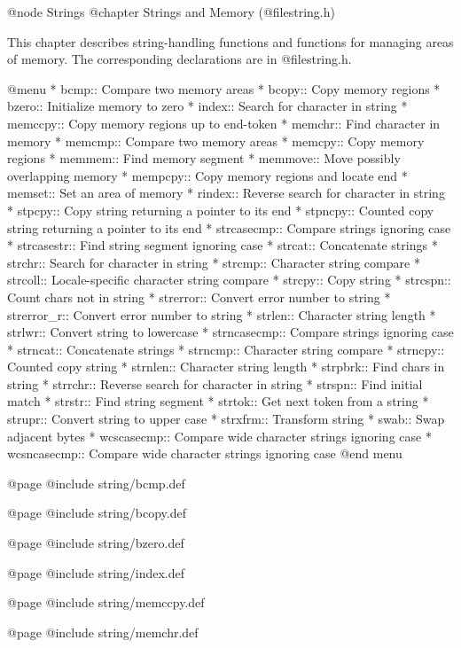 @node Strings
@chapter Strings and Memory (@file{string.h})

This chapter describes string-handling functions and functions for
managing areas of memory.  The corresponding declarations are in
@file{string.h}.

@menu
* bcmp::        Compare two memory areas
* bcopy::       Copy memory regions
* bzero::       Initialize memory to zero
* index::       Search for character in string
* memccpy::     Copy memory regions up to end-token
* memchr::      Find character in memory
* memcmp::      Compare two memory areas
* memcpy::      Copy memory regions
* memmem::      Find memory segment
* memmove::     Move possibly overlapping memory
* mempcpy::	Copy memory regions and locate end
* memset::      Set an area of memory
* rindex::      Reverse search for character in string
* stpcpy::      Copy string returning a pointer to its end
* stpncpy::     Counted copy string returning a pointer to its end
* strcasecmp::	Compare strings ignoring case
* strcasestr::	Find string segment ignoring case
* strcat::      Concatenate strings
* strchr::      Search for character in string
* strcmp::      Character string compare
* strcoll::     Locale-specific character string compare
* strcpy::      Copy string
* strcspn::     Count chars not in string
* strerror::    Convert error number to string
* strerror_r::  Convert error number to string
* strlen::      Character string length
* strlwr::	Convert string to lowercase
* strncasecmp::	Compare strings ignoring case
* strncat::     Concatenate strings
* strncmp::     Character string compare
* strncpy::     Counted copy string
* strnlen::     Character string length
* strpbrk::     Find chars in string
* strrchr::     Reverse search for character in string
* strspn::      Find initial match
* strstr::      Find string segment
* strtok::      Get next token from a string
* strupr::	Convert string to upper case
* strxfrm::     Transform string
* swab::        Swap adjacent bytes
* wcscasecmp::  Compare wide character strings ignoring case
* wcsncasecmp:: Compare wide character strings ignoring case
@end menu

@page
@include string/bcmp.def

@page
@include string/bcopy.def

@page
@include string/bzero.def

@page
@include string/index.def

@page
@include string/memccpy.def

@page
@include string/memchr.def


